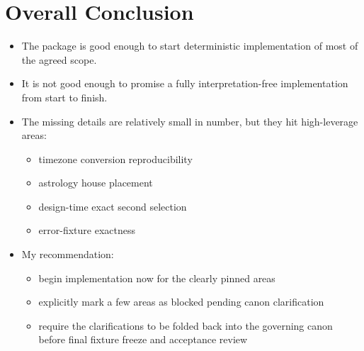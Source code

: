 \documentclass[11pt]{article}
\begin{document}
\section{Overall Conclusion}
\label{sec:orgdacf36d}
\begin{itemize}
\item The package is good enough to start deterministic implementation of most of the agreed scope.
\item It is not good enough to promise a fully interpretation-free implementation from start to finish.
\item The missing details are relatively small in number, but they hit high-leverage areas:
\begin{itemize}
\item timezone conversion reproducibility
\item astrology house placement
\item design-time exact second selection
\item error-fixture exactness
\end{itemize}
\item My recommendation:
\begin{itemize}
\item begin implementation now for the clearly pinned areas
\item explicitly mark a few areas as blocked pending canon clarification
\item require the clarifications to be folded back into the governing canon before final fixture freeze and acceptance review
\end{itemize}
\end{itemize}
\end{document}

